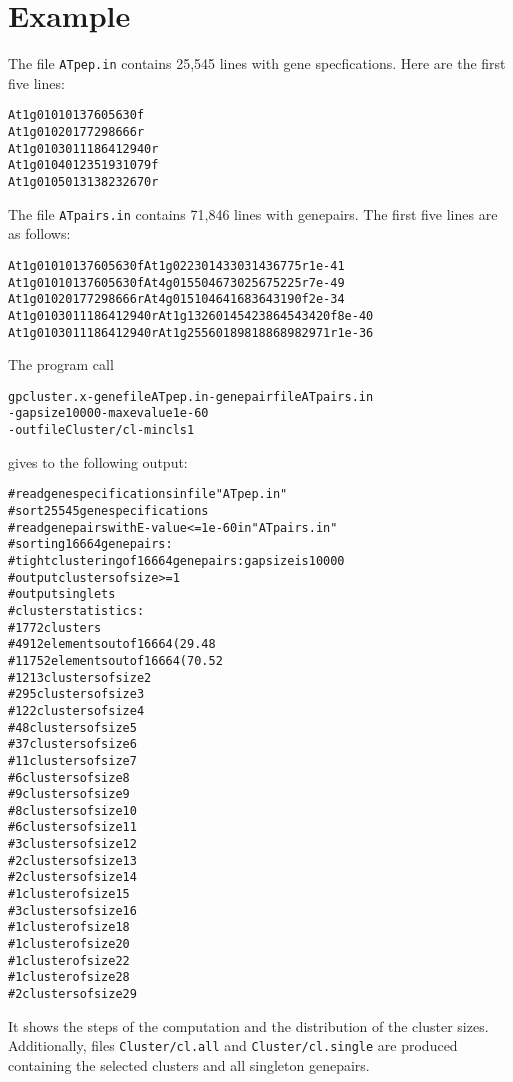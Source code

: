 \documentclass[12pt]{article}
\newcommand{\GPC}{\texttt{gpcluster}\xspace}
\begin{document}
\section{Example}
The file \texttt{ATpep.in} contains 25,545 lines with gene specfications. 
Here are the first five
lines:
\begin{alltt}
At1g01010 1 3760   5630  f
At1g01020 1 7729   8666  r
At1g01030 1 11864  12940 r
At1g01040 1 23519  31079 f
At1g01050 1 31382  32670 r
\end{alltt}
The file \texttt{ATpairs.in} contains 
71,846 lines with genepairs. The first five lines are as follows:
\begin{alltt}
At1g01010 1 3760 5630 f At1g02230 1 433031 436775 r 1e-41
At1g01010 1 3760 5630 f At4g01550 4 673025 675225 r 7e-49
At1g01020 1 7729 8666 r At4g01510 4 641683 643190 f 2e-34
At1g01030 1 11864 12940 r At1g13260 1 4542386 4543420 f 8e-40
At1g01030 1 11864 12940 r At1g25560 1 8981886 8982971 r 1e-36
\end{alltt}

The program call 
\begin{alltt}
\GPC.x -genefile ATpep.in -genepairfile ATpairs.in
            -gapsize 10000 -maxevalue 1e-60 
            -outfile Cluster/cl -mincls 1
\end{alltt}
gives to the following output:
\begin{small}
\begin{alltt}
# read gene specifications in file "ATpep.in"
# sort 25545 gene specifications
# read genepairs with E-value <= 1e-60 in "ATpairs.in"
# sorting 16664 genepairs:
# tight clustering of 16664 genepairs: gapsize is 10000
# output clusters of size >= 1
# output singlets
# cluster statistics:
# 1772 clusters
# 4912 elements out of 16664 (29.48%) are in clusters
# 11752 elements out of 16664 (70.52%) are singlets
# 1213 clusters of size 2
# 295 clusters of size 3
# 122 clusters of size 4
# 48 clusters of size 5
# 37 clusters of size 6
# 11 clusters of size 7
# 6 clusters of size 8
# 9 clusters of size 9
# 8 clusters of size 10
# 6 clusters of size 11
# 3 clusters of size 12
# 2 clusters of size 13
# 2 clusters of size 14
# 1 cluster of size 15
# 3 clusters of size 16
# 1 cluster of size 18
# 1 cluster of size 20
# 1 cluster of size 22
# 1 cluster of size 28
# 2 clusters of size 29
\end{alltt}
\end{small}
It shows the steps of the computation and the distribution of the 
cluster sizes. Additionally, files 
\texttt{Cluster/cl.all} and 
\texttt{Cluster/cl.single} are
produced containing the selected clusters and all singleton genepairs.
\end{document}
